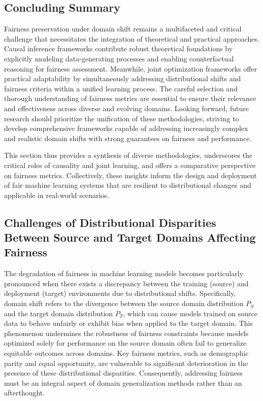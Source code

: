 \documentclass[sigconf]{acmart}
\begin{document}
\subsection{Concluding Summary}
Fairness preservation under domain shift remains a multifaceted and critical challenge that necessitates the integration of theoretical and practical approaches. Causal inference frameworks contribute robust theoretical foundations by explicitly modeling data-generating processes and enabling counterfactual reasoning for fairness assessment. Meanwhile, joint optimization frameworks offer practical adaptability by simultaneously addressing distributional shifts and fairness criteria within a unified learning process. The careful selection and thorough understanding of fairness metrics are essential to ensure their relevance and effectiveness across diverse and evolving domains. Looking forward, future research should prioritize the unification of these methodologies, striving to develop comprehensive frameworks capable of addressing increasingly complex and realistic domain shifts with strong guarantees on fairness and performance.

This section thus provides a synthesis of diverse methodologies, underscores the critical roles of causality and joint learning, and offers a comparative perspective on fairness metrics. Collectively, these insights inform the design and deployment of fair machine learning systems that are resilient to distributional changes and applicable in real-world scenarios.

\subsection{Challenges of Distributional Disparities Between Source and Target Domains Affecting Fairness}

The degradation of fairness in machine learning models becomes particularly pronounced when there exists a discrepancy between the training (source) and deployment (target) environments due to distributional shifts. Specifically, domain shift refers to the divergence between the source domain distribution \(P_S\) and the target domain distribution \(P_T\), which can cause models trained on source data to behave unfairly or exhibit bias when applied to the target domain. This phenomenon undermines the robustness of fairness constraints because models optimized solely for performance on the source domain often fail to generalize equitable outcomes across domains. Key fairness metrics, such as demographic parity and equal opportunity, are vulnerable to significant deterioration in the presence of these distributional disparities. Consequently, addressing fairness must be an integral aspect of domain generalization methods rather than an afterthought.
\end{document}
